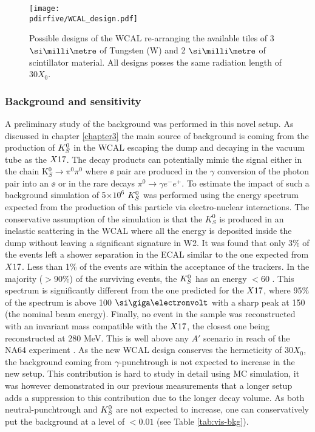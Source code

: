 \begin{figure}[tbh!]
  \centering
  \texttt{[image: \\pdirfive/WCAL\_design.pdf]}
  \caption[New WCAL design for 2021]{Possible designs of the WCAL re-arranging the available tiles of 3 $\mmi$ of Tungsten (W) and 2 $\mmi$ of scintillator material. All designs posses the same radiation length of 30$X_0$.}
  \label{fig:wcal-design}
\end{figure}


\subsubsection{Background and sensitivity}
\label{ch5:sec:background-sensitivity}

A preliminary study of the background was performed in this novel setup. As discussed in chapter \ref{chapter3} the main source of background is coming from the production of $K^0_S$ in the WCAL escaping the dump and decaying in the vacuum tube as the $X17$. The decay products can potentially mimic the signal either in the chain K$^0_S \rightarrow \pi^0 \pi^0$ where $\ee$ pair are produced in the $\gamma$ conversion of the photon pair into an $\ee$ or in the rare decays $\pi^0 \rightarrow \gamma e^- e^+$. To estimate the impact of such a background simulation of 5$\times 10^6$ $K^0_S$ was performed using the energy spectrum expected from the production of this particle via electro-nuclear interactions.
The conservative assumption of the simulation is that the $K^0_S$ is produced in an inelastic scattering in the WCAL where all the energy is deposited inside the dump without leaving a significant signature in W2. It was found that only 3\% of the events left a shower separation in the ECAL similar to the one expected from $X17$. Less than 1\% of the events are within the acceptance of the trackers. In the majority ($>$90\%) of the surviving events, the $K^0_S$ has an energy $<$60 \gev. This spectrum is significantly different from the one predicted for the $X17$, where 95\% of the spectrum is above 100 $\gev$ with a sharp peak at 150 \gev (the nominal beam energy). Finally, no event in the sample was reconstructed with an invariant mass compatible with the $X17$, the closest one being reconstructed at 280 MeV. This is well above any $A'$ scenario in reach of the NA64 experiment \cite{Banerjee:2019hmi}. As the new WCAL design conserves the hermeticity of 30$X_0$, the background coming from $\gamma$-punchtrough is not expected to increase in the new setup. This contribution is hard to study in detail using MC simulation, it was however demonstrated in our previous measurements \cite{Banerjee:2019hmi} that a longer setup adds a suppression to this contribution due to the longer decay volume. As both neutral-punchtrough and $K^0_S$ are not expected to increase, one can conservatively put the background at a level of $<0.01$ (see Table \ref{tab:vis-bkg}).

